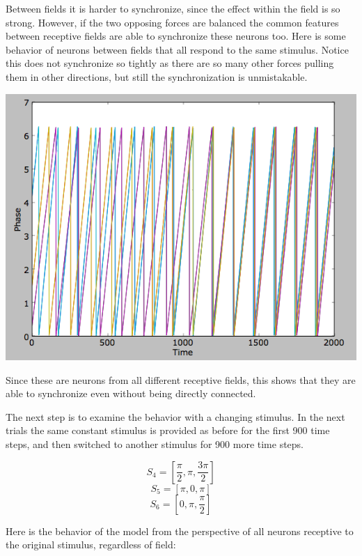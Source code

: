 \documentclass[12pt]{article}
\begin{document}
Between fields it is harder to synchronize, since the effect within the field is so strong.  However, if the two opposing forces are balanced the common features between receptive fields are able to synchronize these neurons too.  Here is some behavior of neurons between fields that all respond to the same stimulus.  Notice this does not synchronize so tightly as there are so many other forces pulling them in other directions, but still the synchronization is unmistakable.  

\vspace{10pt}
\includegraphics[scale=0.6]{betweenfields.png}

Since these are neurons from all different receptive fields, this shows that they are able to synchronize even without being directly connected.  

The next step is to examine the behavior with a changing stimulus.  In the next trials the same constant stimulus is provided as before for the first 900 time steps, and then switched to another stimulus for 900 more time steps.  

$$ S_4=[\frac{\pi}{2},\pi,\frac{3\pi}{2}] $$
$$ S_5=[\pi,0,\pi] $$
$$ S_6=[0,\pi,\frac{\pi}{2}] $$

Here is the behavior of the model from the perspective of all neurons receptive to the original stimulus, regardless of field:
\end{document}
